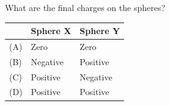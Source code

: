 \begin{enumerate}
  What are the final charges on the spheres?
  
  \begin{center}
  \begin{tabular}{|l|l|l|}
  \hline
  & \textbf{Sphere X} & \textbf{Sphere Y} \\
  \hline
  (A) & Zero & Zero \\
  (B) & Negative & Positive \\
  (C) & Positive & Negative \\
  (D) & Positive & Positive \\
  \hline
  \end{tabular}
  \end{center}
  \begin{subanswer}
  \end{subanswer}
\end{enumerate}

